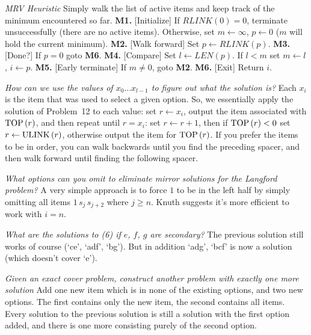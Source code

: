  {\it MRV Heuristic}\hfil\break
Simply walk the list of active items and keep track of the minimum encountered
so far.\hfil\break
{\bf M1.} [Initialize] If $RLINK\left(0\right) = 0$, terminate unsuccessfully (there are no
 active items).  Otherwise, set $m \leftarrow \infty$, $p \leftarrow 0$ ($m$ will hold
 the current minimum).\hfil\break
{\bf M2.} [Walk forward] Set $p \leftarrow RLINK\left(p\right)$.\hfil\break
{\bf M3.} [Done?] If $p = 0$ goto {\bf M6}.\hfil\break
{\bf M4.} [Compare] Set $l \leftarrow LEN\left(p\right)$.  If $l < m$ set $m \leftarrow l$,
 $i \leftarrow p$.\hfil\break
{\bf M5.} [Early terminate] If $m \ne 0$, goto {\bf M2}.\hfil\break
{\bf M6.} [Exit] Return $i$.

 {\it How can we use the values of $x_0\ldots x_{l-1}$ to 
figure out what the solution is?}\hfil\break
Each $x_i$ is the item that was used to select a given option.  So, we
essentially apply the solution of Problem~12 to each value: set $r \leftarrow x_i$,
output the item associated with ${\rm TOP}\left(r\right)$, 
and then repeat until $r = x_i$: set $r \leftarrow r + 1$, then if 
${\rm TOP}\left(r\right) < 0$ set $r\leftarrow {\rm ULINK}\left(r\right)$,
otherwise output the item for ${\rm TOP}\left(r\right)$.  If you prefer the
items to be in order, you can walk backwards until you find the preceding
spacer, and then walk forward until finding the following spacer.

 {\it What options can you omit to eliminate mirror 
solutions for the Langford problem?}\hfil\break
A very simple approach is to force $1$ to be in the left half by simply
omitting all items $1\,s_j\,s_{j+2}$ where $j \ge n$.  Knuth suggests it's
more efficient to work with $i = n$.

 {\it What are the solutions to (6) if $e$, $f$, $g$ 
are secondary?}\hfil\break
The previous solution still works of course (`ce', `adf', `bg').  But in
addition `adg', `bcf' is now a solution (which doesn't cover `e').

 {\it Given an exact cover problem, construct another
problem with exactly one more solution}\hfil\break
Add one new item which is in none of the existing options, and two new
options.  The first contains only the new item, the second contains all items.
Every solution to the previous solution is still a solution with the first
option added, and there is one more consisting purely of the second option.

